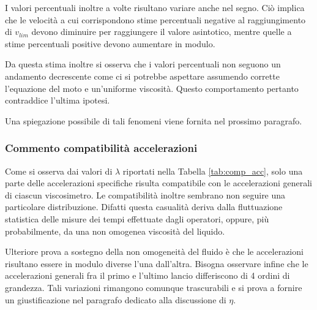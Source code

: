 \documentclass[a4paper,11pt,oneside]{article}
\begin{document}
I valori percentuali inoltre a volte risultano variare anche nel segno. Ciò implica che le velocità a cui corrispondono stime percentuali negative al raggiungimento di $v_{lim}$ devono diminuire per raggiungere il valore asintotico, mentre quelle a stime percentuali positive devono aumentare in modulo. 

Da questa stima inoltre si osserva che i valori percentuali non seguono un andamento decrescente come ci si potrebbe aspettare assumendo corrette l'equazione del moto e un'uniforme viscosità. Questo comportamento pertanto contraddice l'ultima ipotesi.\newline

Una spiegazione possibile di tali fenomeni viene fornita nel prossimo paragrafo. \newline

\subsubsection*{Commento compatibilità accelerazioni}
Come si osserva dai valori di $\lambda$ riportati nella Tabella \ref{tab:comp_acc}, solo una parte delle accelerazioni specifiche risulta compatibile con le accelerazioni generali di ciascun viscosimetro.
Le compatibilità inoltre sembrano non seguire una particolare distribuzione. Difatti questa casualità deriva dalla fluttuazione statistica delle misure dei tempi effettuate dagli operatori, oppure, più probabilmente, da una non omogenea viscosità del liquido.\newline

Ulteriore prova a sostegno della non omogeneità del fluido è che le accelerazioni risultano essere in modulo diverse l'una dall'altra.
Bisogna osservare infine che le accelerazioni generali fra il primo e l'ultimo lancio differiscono di 4 ordini di grandezza. Tali variazioni rimangono comunque trascurabili e si prova a fornire un giustificazione nel paragrafo dedicato alla discussione di $\eta$.\newline



\end{document}
